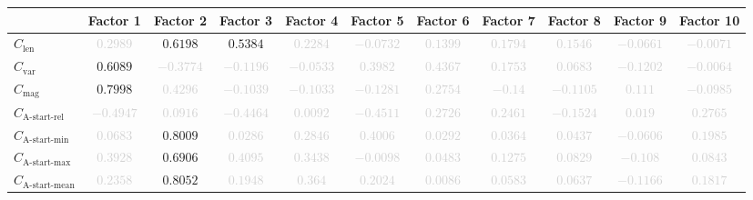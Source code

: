 \documentclass{standalone}
\newcommand{\magnitudename}{\text{mag}}
\newcommand{\magnitude}{C_{\magnitudename}}
\newcommand{\varietyname}{\text{var}}
\newcommand{\variety}{C_{\varietyname}}
\newcommand{\lengthname}{\text{len}}
\newcommand{\length}{C_{\lengthname}}
\newcommand{\startactivitiesrelname}{\text{A-start-rel}}
\newcommand{\startactivitiesrel}{C_{\startactivitiesrelname}}
\newcommand{\startminname}{\text{A-start-min}}
\newcommand{\startmin}{C_{\startminname}}
\newcommand{\startmaxname}{\text{A-start-max}}
\newcommand{\startmax}{C_{\startmaxname}}
\newcommand{\startmeanname}{\text{A-start-mean}}
\newcommand{\startmean}{C_{\startmeanname}}
\begin{document}
\begin{tabular}{lcccccccccc} \toprule 
 & \textbf{Factor 1} & \textbf{Factor 2} & \textbf{Factor 3} & \textbf{Factor 4} & \textbf{Factor 5} & \textbf{Factor 6} & \textbf{Factor 7} & \textbf{Factor 8} & \textbf{Factor 9} & \textbf{Factor 10} \\ \midrule 
$\length$ & \textcolor{lightgray}{$0.2989$} & $0.6198$ & $0.5384$ & \textcolor{lightgray}{$0.2284$} & \textcolor{lightgray}{$-0.0732$} & \textcolor{lightgray}{$0.1399$} & \textcolor{lightgray}{$0.1794$} & \textcolor{lightgray}{$0.1546$} & \textcolor{lightgray}{$-0.0661$} & \textcolor{lightgray}{$-0.0071$} \\ 
$\variety$ & $0.6089$ & \textcolor{lightgray}{$-0.3774$} & \textcolor{lightgray}{$-0.1196$} & \textcolor{lightgray}{$-0.0533$} & \textcolor{lightgray}{$0.3982$} & \textcolor{lightgray}{$0.4367$} & \textcolor{lightgray}{$0.1753$} & \textcolor{lightgray}{$0.0683$} & \textcolor{lightgray}{$-0.1202$} & \textcolor{lightgray}{$-0.0064$} \\ 
$\magnitude$ & $0.7998$ & \textcolor{lightgray}{$0.4296$} & \textcolor{lightgray}{$-0.1039$} & \textcolor{lightgray}{$-0.1033$} & \textcolor{lightgray}{$-0.1281$} & \textcolor{lightgray}{$0.2754$} & \textcolor{lightgray}{$-0.14$} & \textcolor{lightgray}{$-0.1105$} & \textcolor{lightgray}{$0.111$} & \textcolor{lightgray}{$-0.0985$} \\ 
$\startactivitiesrel$ & \textcolor{lightgray}{$-0.4947$} & \textcolor{lightgray}{$0.0916$} & \textcolor{lightgray}{$-0.4464$} & \textcolor{lightgray}{$0.0092$} & \textcolor{lightgray}{$-0.4511$} & \textcolor{lightgray}{$0.2726$} & \textcolor{lightgray}{$0.2461$} & \textcolor{lightgray}{$-0.1524$} & \textcolor{lightgray}{$0.019$} & \textcolor{lightgray}{$0.2765$} \\ 
$\startmin$ & \textcolor{lightgray}{$0.0683$} & $0.8009$ & \textcolor{lightgray}{$0.0286$} & \textcolor{lightgray}{$0.2846$} & \textcolor{lightgray}{$0.4006$} & \textcolor{lightgray}{$0.0292$} & \textcolor{lightgray}{$0.0364$} & \textcolor{lightgray}{$0.0437$} & \textcolor{lightgray}{$-0.0606$} & \textcolor{lightgray}{$0.1985$} \\ 
$\startmax$ & \textcolor{lightgray}{$0.3928$} & $0.6906$ & \textcolor{lightgray}{$0.4095$} & \textcolor{lightgray}{$0.3438$} & \textcolor{lightgray}{$-0.0098$} & \textcolor{lightgray}{$0.0483$} & \textcolor{lightgray}{$0.1275$} & \textcolor{lightgray}{$0.0829$} & \textcolor{lightgray}{$-0.108$} & \textcolor{lightgray}{$0.0843$} \\ 
$\startmean$ & \textcolor{lightgray}{$0.2358$} & $0.8052$ & \textcolor{lightgray}{$0.1948$} & \textcolor{lightgray}{$0.364$} & \textcolor{lightgray}{$0.2024$} & \textcolor{lightgray}{$0.0086$} & \textcolor{lightgray}{$0.0583$} & \textcolor{lightgray}{$0.0637$} & \textcolor{lightgray}{$-0.1166$} & \textcolor{lightgray}{$0.1817$} \\ 

\end{tabular}
\end{document}
